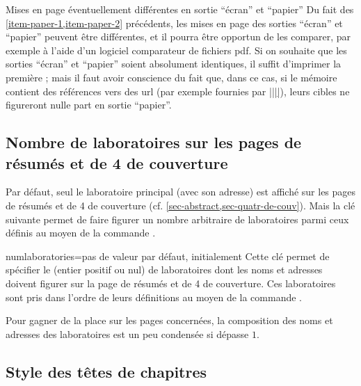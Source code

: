 \begin{dbwarning}{Mises en page éventuellement différentes en sortie
    \enquote{écran} et \enquote{papier}}{}
  Du fait des \cref{item-paper-1,item-paper-2} précédents, les mises en page
  des sorties \enquote{écran} et \enquote{papier} peuvent être différentes, et
  il pourra être opportun de les comparer, par exemple à l'aide d'un logiciel
  comparateur de fichiers \acrshort{pdf}. Si on souhaite que les sorties
  \enquote{écran} et \enquote{papier} soient absolument identiques, il suffit
  d'imprimer la première ; mais il faut avoir conscience du fait que, dans ce
  cas, si le mémoire contient des références vers des \acrshort{url} (par
  exemple fournies par |\href{|\meta{\acrshort*{url}}|}{||}|),
  leurs cibles ne figureront nulle part en sortie \enquote{papier}.
\end{dbwarning}

\subsection{Nombre de laboratoires sur les pages de résumés et de 4\ieme{} de couverture}
\label{sec-nombre-de-labor}

Par défaut, seul le laboratoire principal (avec son adresse) est affiché sur
les pages de résumés et de 4\ieme{} de couverture
(cf. \vref{sec-abstract,sec-quatr-de-couv}). Mais la clé
 suivante permet de faire figurer un nombre arbitraire
de laboratoires parmi ceux définis au moyen de la commande
.%

\begin{docKey}{numlaboratories}{=}{pas de valeur par
    défaut, initialement }
  Cette clé permet de spécifier le  (entier positif ou nul) de
  laboratoires dont les noms et adresses doivent figurer sur la page de résumés
  et de 4\ieme{} de couverture. Ces laboratoires sont pris dans l'ordre de
  leurs définitions au moyen de la commande .
\end{docKey}

Pour gagner de la place sur les pages concernées, la composition des noms et
adresses des laboratoires est un peu condensée si  dépasse $1$.

\subsection{Style des têtes de chapitres}\label{sec-style-des-tetes}

